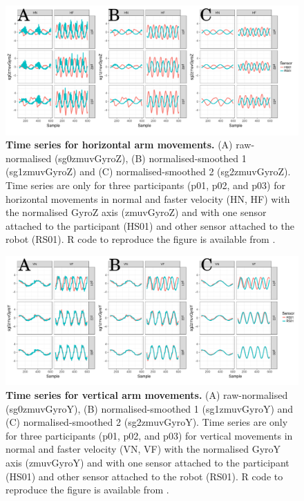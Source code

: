 \begin{figure}[!h]
  \centering
\includegraphics[width=1.0\textwidth]{tsHv03}
    	\caption{ 
	{\bf Time series for horizontal arm movements.}
		(A) raw-normalised (sg0zmuvGyroZ), 
		(B) normalised-smoothed 1 (sg1zmuvGyroZ) and
		(C) normalised-smoothed 2 (sg2zmuvGyroZ).
		Time series are only for three participants (p01, p02, and p03) 
		for horizontal movements in normal and faster velocity (HN, HF) 
		with the normalised GyroZ axis (zmuvGyroZ) 
		and with one sensor attached to the participant (HS01) 
		and other sensor attached to the robot (RS01).	
	R code to reproduce the figure is available from \cite{hwum2018}.
        }
    \label{fig:tsH}
\end{figure}
\begin{figure}[!h]
  \centering
\includegraphics[width=1.0\textwidth]{tsVv03}
	\caption{ 
	{\bf Time series for vertical arm movements.}
		(A) raw-normalised (sg0zmuvGyroY), 
		(B) normalised-smoothed 1 (sg1zmuvGyroY) and
		(C) normalised-smoothed 2 (sg2zmuvGyroY).
		Time series are only for three participants (p01, p02, and p03) 
		for vertical movements in normal and faster velocity (VN, VF) 
		with the normalised GyroY axis (zmuvGyroY) 
		and with one sensor attached to the participant (HS01) 
		and other sensor attached to the robot (RS01).
		R code to reproduce the figure is available 
		from \cite{hwum2018}.
        }
    \label{fig:tsV}
\end{figure}









